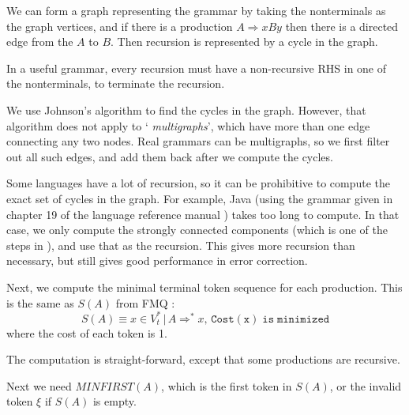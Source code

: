 \documentclass{article}
\begin{document}
We can form a graph representing the grammar by taking the
nonterminals as the graph vertices, and if there is a production $A
\Rightarrow xBy$ then there is a directed edge from the $A$ to $B$.
Then recursion is represented by a cycle in the graph.

In a useful grammar, every recursion must have a non-recursive
RHS in one of the nonterminals, to terminate the recursion.

We use Johnson's algorithm \cite{graph-cycles} to find the cycles in
the graph. However, that algorithm does not apply to `{\it
  multigraphs}', which have more than one edge connecting any two
nodes. Real grammars can be multigraphs, so we first filter out all
such edges, and add them back after we compute the cycles.

Some languages have a lot of recursion, so it can be prohibitive to
compute the exact set of cycles in the graph. For example, Java (using
the grammar given in chapter 19 of the language reference manual
\cite{javarm}) takes too long to compute. In that case, we only
compute the strongly connected components (which is one of the steps
in \cite{graph-cycles}), and use that as the recursion. This gives
more recursion than necessary, but still gives good performance in
error correction.

Next, we compute the minimal terminal token sequence for each production.
This is the same as $S(A)$ from FMQ \cite{FMQ 1980}:
\begin{equation}
S(A) \equiv x \in V_t^* \, |\, A \Rightarrow^* x, \, \mathtt{Cost(x)\; is\; minimized}
\end{equation}
where the cost of each token is 1.

The computation is straight-forward, except that some productions are
recursive.

Next we need $MINFIRST(A)$, which is the first token in $S(A)$, or the
invalid token $\xi$ if $S(A)$ is empty.
\end{document}
